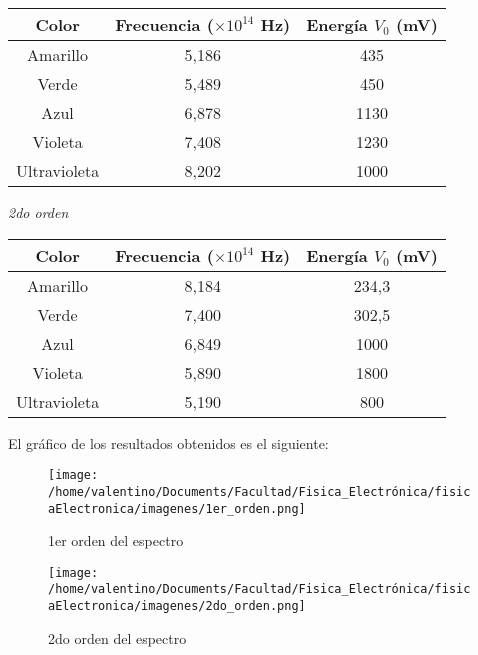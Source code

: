 \documentclass[a4paper]{article}
\begin{document}
      \begin{tabular}{ c c c }
        \toprule
        Color & Frecuencia ($\times 10^{14}$ Hz) & Energía $V_{0}$ (mV)\\
          \midrule
          Amarillo      & 5,186 & 435   \\
          Verde         & 5,489 & 450   \\
          Azul          & 6,878 & 1130  \\
          Violeta       & 7,408 & 1230  \\
          Ultravioleta  & 8,202 & 1000  \\
        \bottomrule
      \end{tabular}

      \begin{minipage}[c]{7.5cm}
        \vspace{5mm}
        \centering
        \textit{2do orden} 
        \vspace{2mm}
      \end{minipage}

      \begin{tabular}{ c c c }
        \toprule
        Color & Frecuencia ($\times 10^{14}$ Hz) & Energía $V_{0}$ (mV) \\
          \midrule
          Amarillo      & 8,184 & 234,3 \\
          Verde         & 7,400 & 302,5 \\
          Azul          & 6,849 & 1000  \\
          Violeta       & 5,890 & 1800  \\
          Ultravioleta  & 5,190 & 800   \\
        \bottomrule
      \end{tabular}
      \vspace{25mm}

      \indent El gráfico de los resultados obtenidos es el siguiente:

      \begin{figure}[h]
        \centering
        \texttt{[image: /home/valentino/Documents/Facultad/Fisica\_Electrónica/fisicaElectronica/imagenes/1er\_orden.png]}
        \caption{\small 1er orden del espectro}
      \end{figure} 

      \begin{figure}[ht]
        \centering
        \texttt{[image: /home/valentino/Documents/Facultad/Fisica\_Electrónica/fisicaElectronica/imagenes/2do\_orden.png]}
        \caption{\small 2do orden del espectro}
      \end{figure}
      \vspace{5mm}
\end{document}
